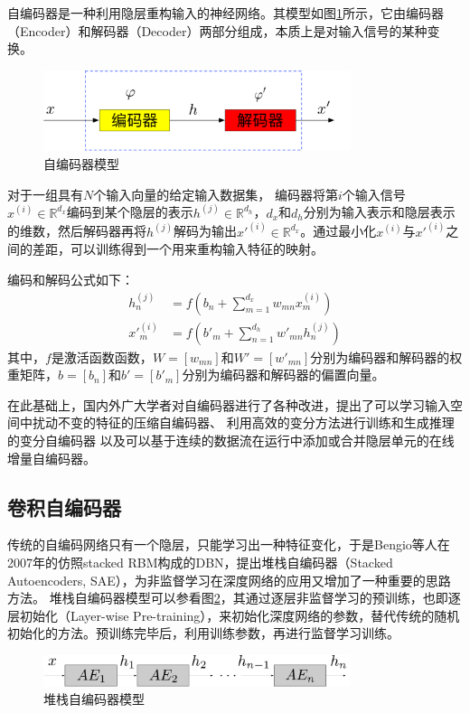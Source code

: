 自编码器是一种利用隐层重构输入的神经网络。其模型如图\ref{fig:ae}所示，它由编码器（Encoder）和解码器（Decoder）两部分组成，本质上是对输入信号的某种变换。
\begin{figure}[hbt]
	\centering
	\includegraphics[width=9cm]{figures/AE/ae}
	\caption{自编码器模型}
	\label{fig:ae}
\end{figure}
对于一组具有$N$个输入向量的给定输入数据集，
编码器将第$i$个输入信号$x^{(i)}\in\mathbb{R}^{d_x}$编码到某个隐层的表示$h^{(j)}\in\mathbb{R}^{d_h}$，$d_x$和$d_h$分别为输入表示和隐层表示的维数，然后解码器再将$h^{(j)}$解码为输出$x'^{(i)}\in\mathbb{R}^{d_x}$。通过最小化$x^{(i)}$与$x'^{(i)}$之间的差距，可以训练得到一个用来重构输入特征的映射。

编码和解码公式如下：
\begin{align}
	h^{(j)}_n &= f(b_n+\sum_{m=1}^{d_x}w_{mn}x^{(i)}_m) \\
	x'^{(i)}_m &= f(b'_m+\sum_{n=1}^{d_h}w'_{mn}h^{(j)}_n)
\end{align}
其中，$f$是激活函数函数，${W}=[w_{mn}]$和${W}'=[w'_{mn}]$分别为编码器和解码器的权重矩阵，${b}=[b_n]$和${b'}=[b'_m]$分别为编码器和解码器的偏置向量。

在此基础上，国内外广大学者对自编码器进行了各种改进，提出了可以学习输入空间中扰动不变的特征的压缩自编码器、
利用高效的变分方法进行训练和生成推理的变分自编码器
以及可以基于连续的数据流在运行中添加或合并隐层单元的在线增量自编码器。

\subsection{卷积自编码器}
传统的自编码网络只有一个隐层，只能学习出一种特征变化，于是Bengio等人在2007年的仿照stacked RBM构成的DBN，提出堆栈自编码器（Stacked Autoencoders, SAE），为非监督学习在深度网络的应用又增加了一种重要的思路方法。
堆栈自编码器模型可以参看图\ref{fig:sae}，其通过逐层非监督学习的预训练，也即逐层初始化（Layer-wise Pre-training），来初始化深度网络的参数，替代传统的随机初始化的方法。预训练完毕后，利用训练参数，再进行监督学习训练。

\begin{figure}
	\centering
	\includegraphics[width=9cm]{figures/AE/sae}
	\caption{堆栈自编码器模型}
	\label{fig:sae}
\end{figure}


